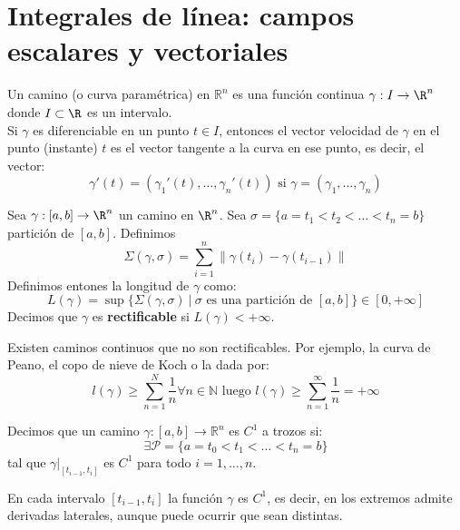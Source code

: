 \section{Integrales de línea: campos escalares y vectoriales}

\begin{definición}[Camino]
    Un camino (o curva paramétrica) en $\mathbb{R}^n$ es una función continua $\gamma: I \to \R^n$ donde $I \subset \R$ es un intervalo. \\
    Si $\gamma$ es diferenciable en un punto $t \in I$, entonces el vector velocidad de $\gamma$ en el punto (instante) $t$ es el vector tangente a la curva en ese punto, es decir, el vector:
$$\gamma'(t) = (\gamma_1'(t), \ldots, \gamma_n'(t)) \text{ si } \gamma = (\gamma_1, \ldots, \gamma_n)$$
    \end{definición}

    \begin{definición}
    Sea $\gamma: [a,b] \to \R^n$ un camino en $\R^n$. Sea $\sigma = \{a = t_1 < t_2 < \ldots < t_n = b\}$ partición de $[a,b]$. Definimos $$\Sigma(\gamma, \sigma) = \sum_{i = 1}^{n} \lVert \gamma(t_i) - \gamma(t_{i-1}) \rVert $$
    Definimos entones la longitud de $\gamma$ como: $$L(\gamma) = \sup\{\Sigma(\gamma, \sigma) \ | \  \sigma \text{ es una partición de } [a, b]\} \in [0, + \infty]$$
    Decimos que $\gamma$ es \textbf{rectificable} si $L(\gamma) < + \infty$.
    \end{definición}

    \begin{observación}
    Existen caminos continuos que no son rectificables. Por ejemplo, la curva de Peano, el copo de nieve de Koch o la dada por:
$$l(\gamma) \geq \sum_{n = 1}^{N}\frac{1}{n} \forall n \in \mathbb{N} \text{ luego } l(\gamma) \geq \sum_{n = 1}^{\infty}\frac{1}{n} = + \infty$$
    \end{observación}

    \begin{definición}
    Decimos que un camino $\gamma: [a, b] \to \mathbb{R}^n$ es $C^1$ a trozos si:
$$\exists \mathcal{P} = \{a = t_0 < t_1 < \ldots < t_n = b\}$$ tal que $\gamma|_{[t_{i-1}, t_i]}$ es $C^1$ para todo $i = 1, \ldots, n$.
    \end{definición}

    \begin{observación}
    En cada intervalo $[t_{i-1}, t_i]$ la función $\gamma$ es $C^1$, es decir, en los extremos admite derivadas laterales, aunque puede ocurrir que sean distintas.
    \end{observación}

